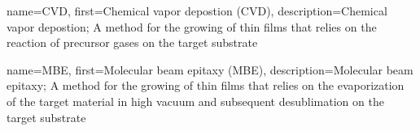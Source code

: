 {
    name={CVD},
    first={Chemical vapor depostion (CVD)},
    description={Chemical vapor depostion; A method for the growing of thin films that relies on the reaction of precursor gases on the target substrate}
}

{
    name={MBE},
    first={Molecular beam epitaxy (MBE)},
    description={Molecular beam epitaxy; A method for the growing of thin films that relies on the evaporization of the target material in high vacuum and subsequent desublimation on the target substrate}
}